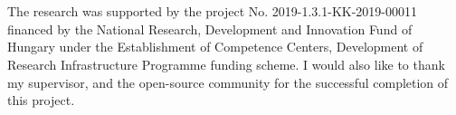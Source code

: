 \documentclass[
]{elteikthesis}[2024/04/26]
\begin{document}

\cleardoublepage


\cleardoublepage

\chapter*{\acklabel}
The research was supported by the project No. 2019-1.3.1-KK-2019-00011 financed by the National Research, Development and Innovation Fund of Hungary under the Establishment of Competence Centers, Development of Research Infrastructure Programme funding scheme. I would also like to thank my supervisor, and the open-source community for the successful completion of this project.
{}
\printbibliography[title=\biblabel]
\cleardoublepage

{}
\listoffigures
\cleardoublepage

{}
\listoftables
\cleardoublepage

{}
\listofequations
\cleardoublepage
\end{document}
